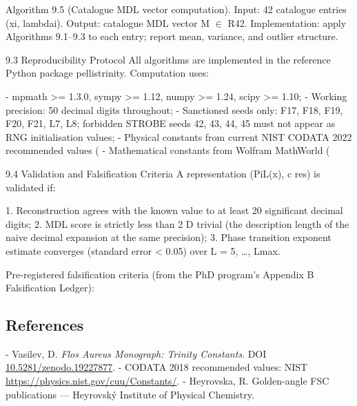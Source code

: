   Algorithm 9.5 (Catalogue MDL vector computation).
  Input: 42 catalogue entries {(xi, lambdai)}.
  Output: catalogue MDL vector M $\in$ R42.
  Implementation: apply Algorithms 9.1--9.3 to each entry; report mean, variance, and
  outlier structure.

  9.3 Reproducibility Protocol
  All algorithms are implemented in the reference Python package pellistrinity.
  Computation uses:

  - mpmath >= 1.3.0, sympy >= 1.12, numpy >= 1.24, scipy >= 1.10;
  - Working precision: 50 decimal digits throughout;
  - Sanctioned seeds only: {F17, F18, F19, F20, F21, L7, L8}; forbidden STROBE seeds
  {42, 43, 44, 45} must not appear as RNG initialisation values;
  - Physical constants from current NIST CODATA 2022 recommended values (
  - Mathematical constants from Wolfram MathWorld (

  9.4 Validation and Falsification Criteria
  A representation (PiL(x), c res) is validated if:

  1. Reconstruction agrees with the known value to at least 20 significant decimal digits;
  2. MDL score is strictly less than 2 D trivial (the description length of the naive decimal
  expansion at the same precision);
  3. Phase transition exponent estimate converges (standard error < 0.05) over L = 5, …,
  Lmax.

  Pre-registered falsification criteria (from the PhD program's Appendix B Falsification
  Ledger):

\subsection{References}

- Vasilev, D. \textit{Flos Aureus Monograph: Trinity Constants}. DOI \href{https://zenodo.org/doi/10.5281/zenodo.19227877}{10.5281/zenodo.19227877}.
- CODATA 2018 recommended values: NIST \href{https://physics.nist.gov/cuu/Constants/}{https://physics.nist.gov/cuu/Constants/}.
- Heyrovska, R. Golden-angle FSC publications --- Heyrovský Institute of Physical Chemistry.
